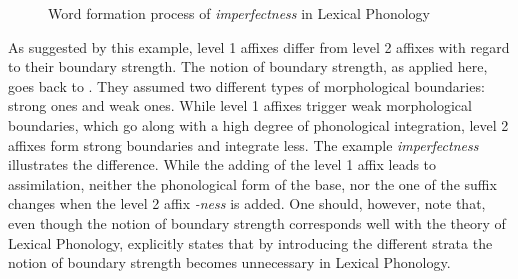 \begin{figure*} [t!]
{}
	\caption{Word formation process of \textit{imperfectness} in Lexical Phonology\label{fig:Word Formation Process imperfectness}}
\end{figure*}


As suggested by this example, level 1 affixes differ from level 2 affixes with regard to their boundary strength. The notion of boundary strength, as applied here, goes back to \cite{Chomsky.1968}. They assumed two different types of morphological boundaries: strong ones and weak ones.  While level 1 affixes trigger weak morphological boundaries, which go along with a high degree of phonological integration, level 2 affixes form strong boundaries and integrate less. The example \textit{imperfectness}  illustrates the difference. While the adding of the level 1 affix  leads to assimilation, neither the phonological  form of the base, nor the one of the suffix changes when the level 2 affix \textit{-ness} is added. One should, however, note that, even though the notion of boundary strength corresponds well with the theory of Lexical Phonology, \citet[239]{Kiparsky.1985} explicitly states that by introducing the different strata the notion of boundary strength becomes unnecessary in Lexical Phonology. 

